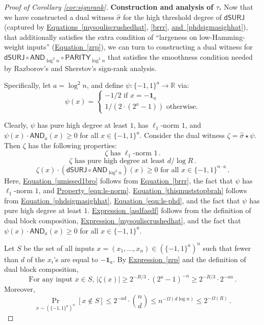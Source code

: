 \documentclass[11pt]{article}
\numberwithin{equation}{section}
\theoremstyle{definition}
\theoremstyle{plain}
\newcommand{\R}{\mathbb R}
\newcommand{\expeqref}[2]{\hyperref[#2]{#1~\eqref{#2}}}
\newcommand{\dumSURJ}{\mathsf{dSURJ}}
\newcommand{\bits}{\{-1,1\}}
\newcommand{\ls}{\star}
\newcommand{\AND}{\mathsf{AND}}
\newcommand{\PARITY}{\mathsf{PARITY}}
\begin{document}
\begin{proof}[Proof of Corollary \ref{cor:signrank}]
\medskip \noindent \textbf{Construction and analysis of $\tau$.}
Now that we have constructed a dual witness $\hat{\sigma}$ for the high threshold degree of $\dumSURJ$ 
(captured by \expeqref{Equations}{mysouliscrushedhat}, \eqref{brrr}, \expeqref{and}{phdsigmasighhat}), that additionally %
%
satisfies  %
the extra condition
of ``largeness on low-Hamming-weight inputs'' (\expeqref{Equation}{zrp}),
we can turn to constructing a dual witness for $\dumSURJ \circ \AND_{\log^2 n} \circ \PARITY_{\log^3 n}$
that satisfies the smoothness condition needed by Razborov's and Sherstov's sign-rank analysis.

Specifically, let $a=\log^2 n$, and define $\psi \colon \bits^{a} \to \R$ via:
$$\psi(x) = \begin{cases} -1/2 \text{ if } x=\mathbf{-1}_{a}\\
1/(2 \cdot (2^a-1)) \text{ otherwise}. \end{cases}$$

Clearly, $\psi$ has pure high degree at least $1$, has $\ell_1$-norm $1$, and $\psi(x) \cdot \AND_a(x) \geq 0$
for all $x \in \bits^a$.
Consider the dual witness $\zeta = \hat{\sigma} \ls \psi$. 
Then $\zeta$ has the following properties:
\begin{equation} \label{umissed1bro}
\zeta \text{ has } \ell_1\text{-norm } 1\,.
\end{equation}
\begin{equation} \label{thismuststopbrah}
\zeta \text{ has pure high degree at least } d/\log R\,.
\end{equation}
\begin{equation} \label{asdfasdf}
\zeta(x) \cdot \left(\dumSURJ \circ \AND_{\log^2 n}\right)(x) \geq 0 \text{ for all } x \in \bits^{n \cdot a}\,. %
\end{equation}
Here, \expeqref{Equation}{umissed1bro} follows from \expeqref{Equation}{brrr}, the fact that $\psi$ has $\ell_1$-norm $1$, and \expeqref{Property}{eqn:ls-norm}. \expeqref{Equation}{thismuststopbrah} follows from \expeqref{Equation}{phdsigmasighhat}, \expeqref{Equation}{eqn:ls-phd},
and the fact that $\psi$ has pure high degree at least $1$.
\expeqref{Expression}{asdfasdf} follows from the definition of dual block composition, \expeqref{Expression}{mysouliscrushedhat},
and the fact that $\psi(x) \cdot \AND_a(x) \geq 0$
for all $x \in \bits^a$.

Let $S$ be the set of all inputs $x=(x_1, \dots, x_n) \in \left(\bits^a\right)^{n}$ such that 
fewer than $d$ 
of the $x_i$'s are equal to $-\mathbf{1}_a$.
By \expeqref{Expression}{zrp} and the definition of dual block composition,
\begin{equation} \label{eq:tautautau}
\text{For any input } x\in S\text{, } |\zeta(x)| \geq 2^{-R/3} \cdot (2^{a}-1)^{-n} \geq 2^{-R/3}  \cdot 2^{-an}\,.\end{equation}
Moreover, 
\begin{equation}
\label{eq:tautautau2} \Pr_{x \sim \left(\bits^a\right)^n}[x \not \in S] 
\leq 2^{-a d} \cdot {n \choose d} \leq n^{-\Omega(d \log n)} \leq 2^{-\Omega(R)}\,. \end{equation}


\end{proof}
\end{document}
